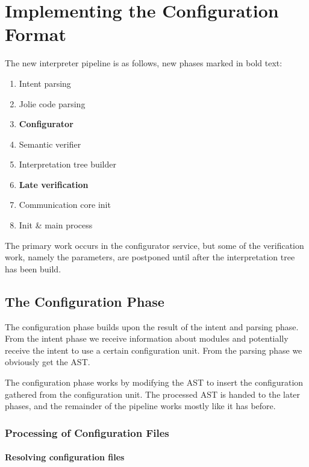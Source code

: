 \section{Implementing the Configuration Format}
\label{sec:col_impl}

The new interpreter pipeline is as follows, new phases marked in bold text:

\begin{enumerate}
\item Intent parsing
\item Jolie code parsing
\item \textbf{Configurator}
\item Semantic verifier
\item Interpretation tree builder
\item \textbf{Late verification}
\item Communication core init
\item Init \& main process
\end{enumerate}

The primary work occurs in the configurator service, but some of the
verification work, namely the parameters, are postponed until after the
interpretation tree has been build.

\subsection{The Configuration Phase}

The configuration phase builds upon the result of the intent and parsing phase.
From the intent phase we receive information about modules and potentially
receive the intent to use a certain configuration unit. From the parsing phase
we obviously get the AST.

The configuration phase works by modifying the AST to insert the configuration
gathered from the configuration unit. The processed AST is handed to the later
phases, and the remainder of the pipeline works mostly like it has before.

\subsubsection*{Processing of Configuration Files}

\paragraph{Resolving configuration files}

